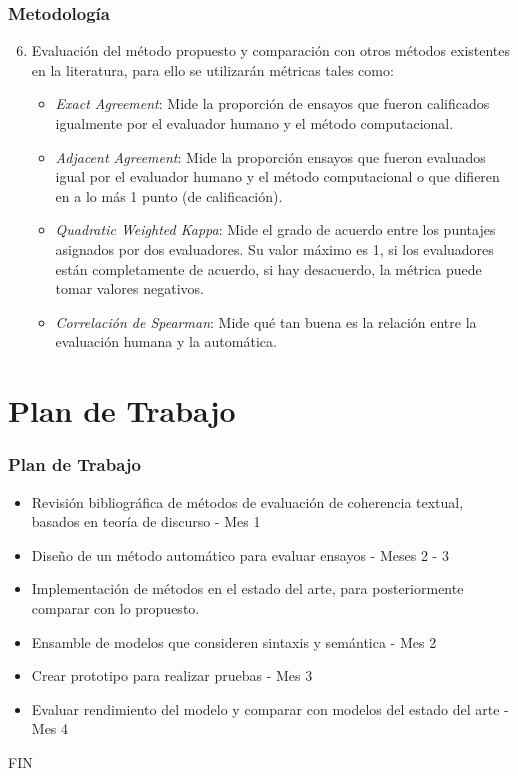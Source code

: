 \documentclass{beamer}
\begin{document}
\begin{frame}
\frametitle{Metodología}
\begin{enumerate}
\setcounter{enumi}{5}
	\item Evaluación del método propuesto y comparación con otros métodos existentes en la literatura, para ello se utilizarán métricas tales como:
	
	\begin{itemize}
		\item {\em Exact Agreement}: Mide la proporción de ensayos que fueron calificados igualmente por el evaluador humano y el método computacional.
		\item {\em Adjacent Agreement}: Mide la proporción ensayos que fueron evaluados igual por el evaluador humano y el método computacional o que difieren en a lo más 1 punto (de calificación).
		\item {\em Quadratic Weighted Kappa}: Mide el grado de acuerdo entre los puntajes asignados por dos evaluadores. Su valor máximo es 1, si los evaluadores están completamente de acuerdo, si hay desacuerdo, la métrica puede tomar valores negativos.
		\item {\em Correlación de Spearman}: Mide qué tan buena es la relación entre la evaluación humana y la automática.
	\end{itemize}

\end{enumerate}

\end{frame}

\section{Plan de Trabajo}
\begin{frame}
\frametitle{Plan de Trabajo}
\begin{itemize}
	\item Revisión bibliográfica de métodos de evaluación de coherencia textual, basados en teoría de discurso - Mes 1
	\item Diseño de un método automático para evaluar ensayos - Meses 2 - 3
	\item Implementación de métodos en el estado del arte, para posteriormente comparar con lo propuesto.
	\item Ensamble de modelos que consideren sintaxis y semántica - Mes 2
	\item Crear prototipo para realizar pruebas - Mes 3
	\item Evaluar rendimiento del modelo y comparar con modelos del estado del arte - Mes 4
\end{itemize}
\end{frame}

\begin{frame}
\Huge{\centerline{FIN}}
\end{frame}

\end{document}
